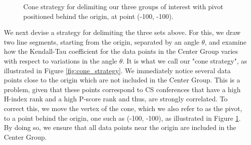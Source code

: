 \documentclass[man]{apa6}
\begin{document}
\begin{figure}[h!]
  \begin{center}
    \caption{Cone strategy for delimiting our three groups of interest with pivot positioned behind the origin, at point (-100, -100).}
    \label{fig:cone_strategy_adapted}
  \end{center}
\end{figure}


We next devise a strategy for delimiting the three sets
above. For this, we draw two line segments, starting from
the origin, separated by an angle $ \theta $, and examine
how the Kendall-Tau coefficient for the data points in the Center Group varies with respect to variations in the angle $ \theta $. It is what we call our "cone strategy", as illustrated in Figure \ref{fig:cone_strategy}. We immediately notice several data points close to the origin
which are not included in the Center Group. This is a problem, given that these points correspond to CS conferences that have a high H-index rank and a high
P-score rank and thus, are strongly correlated. To
correct this, we move the vertex of the cone, which we also
refer to as the pivot, to a point behind the origin, one
such as (-100, -100), as illustrated in Figure \ref{fig:cone_strategy_adapted}. By doing so, we ensure that all data points near the origin are included in the
Center Group.
\end{document}
